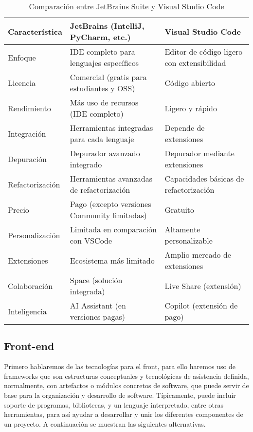 \begin{table}[H]
	\centering

	\begin{tabular}{|>{\raggedright}p{3cm}|p{4cm}|p{4cm}|} 
		\hline
		\textbf{Característica} & \textbf{JetBrains (IntelliJ, PyCharm, etc.)} & \textbf{Visual Studio Code} \\ \hline
		Enfoque & IDE completo para lenguajes específicos & Editor de código ligero con extensibilidad \\ \hline
		Licencia & Comercial (gratis para estudiantes y OSS) & Código abierto \\ \hline
		Rendimiento & Más uso de recursos (IDE completo) & Ligero y rápido \\ \hline
		Integración & Herramientas integradas para cada lenguaje & Depende de extensiones \\ \hline
		Depuración & Depurador avanzado integrado & Depurador mediante extensiones \\ \hline
		Refactorización & Herramientas avanzadas de refactorización & Capacidades básicas de refactorización \\ \hline
		Precio & Pago (excepto versiones Community limitadas) & Gratuito \\ \hline
		Personalización & Limitada en comparación con VSCode & Altamente personalizable \\ \hline
		Extensiones & Ecosistema más limitado & Amplio mercado de extensiones \\ \hline
		Colaboración & Space (solución integrada) & Live Share (extensión) \\ \hline
		Inteligencia & AI Assistant (en versiones pagas) & Copilot (extensión de pago) \\ \hline
	\end{tabular}
		\caption{Comparación entre JetBrains Suite y Visual Studio Code}
\end{table}


\subsection{Front-end}

Primero hablaremos de las tecnologías para el front, para ello haremos uso de frameworks \cite{framework} que son estructuras conceptuales y tecnológicas de asistencia definida, normalmente, con artefactos o módulos concretos de software, que puede servir de base para la organización y desarrollo de software. Típicamente, puede incluir soporte de programas, bibliotecas, y un lenguaje interpretado, entre otras herramientas, para así ayudar a desarrollar y unir los diferentes componentes de un proyecto. A continuación se muestran las siguientes alternativas.

